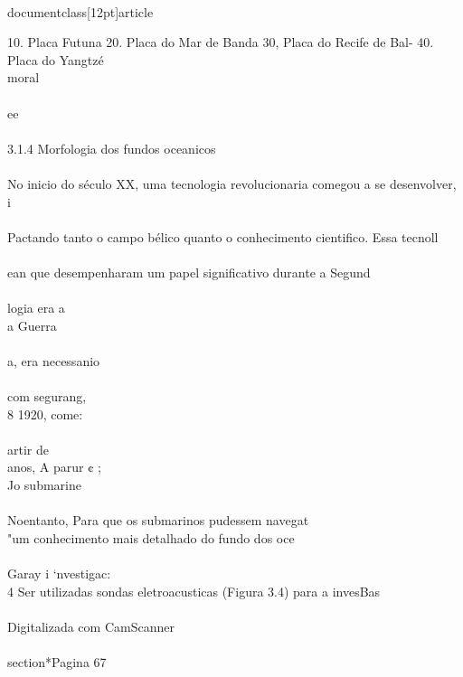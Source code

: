 \\documentclass[12pt]{article}
\begin{document}
10. Placa Futuna 20. Placa do Mar de Banda 30, Placa do Recife de Bal- 40. Placa do Yangtzé\\
moral\\
\\
ee\\
\\
3.1.4 Morfologia dos fundos oceanicos\\
\\
No inicio do século XX, uma tecnologia revolucionaria comegou a se desenvolver, i\\
\\
Pactando tanto o campo bélico quanto o conhecimento cientifico. Essa tecnoll\\
\\
ean que desempenharam um papel significativo durante a Segund\\
\\
logia era a\\
a Guerra\\
\\
a, era necessanio\\
\\
com segurang,\\
8 1920, come:\\
\\
artir de\\
anos, A parur ¢ ;\\
Jo submarine\\
\\
Noentanto, Para que os submarinos pudessem navegat\\
"um conhecimento mais detalhado do fundo dos oce\\
\\
Garay i ‘nvestigac:\\
4 Ser utilizadas sondas eletroacusticas (Figura 3.4) para a invesBas\\
\\
Digitalizada com CamScanner\\

\\section*{Pagina 67}
\end{document}
